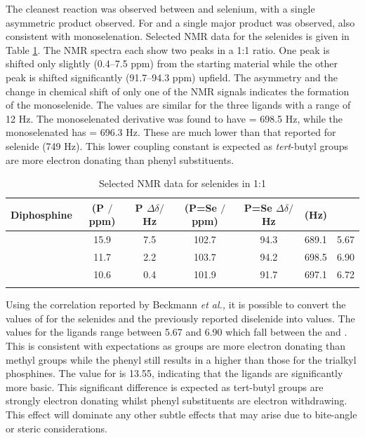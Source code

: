 The cleanest reaction was observed between \tBuxantphos{} and selenium, with a single asymmetric product observed.  For \tButhixantphos{} and \tBusixantphos{} a single major product was observed, also consistent with monoselenation. Selected NMR data for the selenides is given in Table \ref{table:selenides}.  The \phosphorus{} NMR spectra each show two peaks in a 1:1 ratio.  One peak is shifted only slightly (0.4--7.5 ppm) from the starting material while the other peak is shifted significantly (91.7--94.3 ppm) upfield.  The asymmetry and the change in chemical shift of only one of the \phosphorus{} NMR signals indicates the formation of the monoselenide.  The \JPSe{} values are similar for the three ligands with a range of 12 Hz.  The monoselenated \tButhixantphos{} derivative was found to have \JPSe{} = 698.5 Hz, while the monoselenated \tBuxantphos{} has \JPSe{} = 696.3 Hz.  These are much lower than that reported for \Phxantphos{} selenide (749 Hz)\cite{Jahromi2012}.  This lower coupling constant is expected as \emph{tert}-butyl groups are more electron donating than phenyl substituents.

\begin{table}
\caption[Selected \phosphorus{} NMR data for \tBuxantphos{} selenides]{Selected \phosphorus{} NMR data for \tBuxantphos{} selenides in 1:1 }
\vspace{1em}
\label{table:selenides}
\small
\begin{center}
\begin{tabular}{l c c c c c c}
	\toprule
	\bfseries{Diphosphine} & \bfseries{\phosphorus{} (P $/$ppm)} & \bfseries{P $\Delta\delta/$Hz} &\bfseries{\phosphorus{} (P=Se $/$ppm)} & \bfseries{P=Se $\Delta\delta/$Hz} & \bfseries{\JPSe (Hz)} & \bfseries{\pKb} \\
	\midrule		
	\tBuSixantphos		&15.9	& 7.5 	& 102.7	& 94.3	& 689.1	& 5.67\\
	\tBuThixantphos	&11.7	& 2.2		& 103.7	& 94.2	& 698.5	& 6.90\\
	\tBuXantphos		&10.6	& 0.4		& 101.9	& 91.7	& 697.1	& 6.72\\
	\bottomrule{}
\end{tabular}
\end{center}
\end{table}

Using the correlation reported by Beckmann \emph{et al.,} it is possible to convert the values of \JPSe{} for the \tBuxantphos{} selenides and the previously reported \Phxantphos{} diselenide into \pKb{} values.\cite{Jahromi2012}  The \pKb{} values for the \tBuxantphos{} ligands range between 5.67 and 6.90 which fall between the  and .\cite{Beckmann2011}  This is consistent with expectations as \tBu{} groups are more electron donating than methyl groups while the phenyl still results in a higher \pKb{} than those for the trialkyl phosphines.  The \pKb{} value for \Phxantphos{} is 13.55, indicating that the \tBuxantphos{} ligands are significantly more basic.  This significant difference is expected as tert-butyl groups are strongly electron donating whilst phenyl substituents are electron withdrawing.\cite{Tolman1977}  This effect will dominate any other subtle effects that may arise due to bite-angle or steric considerations.  
  
